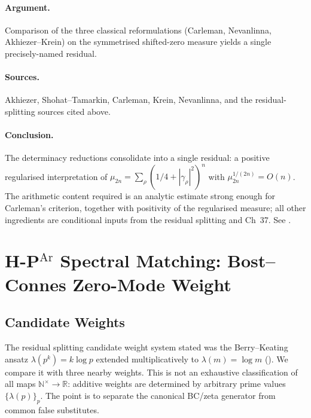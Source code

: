 \paragraph{Argument.} Comparison of the three classical reformulations
(Carleman, Nevanlinna, Akhiezer--Krein) on the symmetrised shifted-zero
measure yields a single precisely-named residual.

\paragraph{Sources.} Akhiezer, Shohat--Tamarkin, Carleman, Krein,
Nevanlinna, and the residual-splitting sources cited above.

\paragraph{Conclusion.} The determinacy reductions consolidate into a single
residual: a positive regularised interpretation of
\(\mu_{2n}=\sum_{\rho}(1/4+|\gamma_{\rho}|^{2})^{n}\) with
\(\mu_{2n}^{1/(2n)}=O(n)\). The arithmetic content required is
an analytic estimate strong enough for Carleman's criterion, together
with positivity of the regularised measure; all other ingredients
are conditional inputs from the residual splitting and Ch~37. See
.

\section{H-P\(^{\mathrm{Ar}}\) Spectral Matching: Bost--Connes Zero-Mode Weight}
\label{v4-arith:hpar-det:weight-selection}

\subsection{Candidate Weights}
\label{v4-arith:hpar-det:candidate-weights}

The residual splitting candidate weight system stated was the Berry--Keating
ansatz \(\lambda(p^{k})=k\log p\) extended multiplicatively to
\(\lambda(m)=\log m\) (). We
compare it with three nearby weights. This is not an
exhaustive classification of all maps
\(\mathbb{N}^{\times}\to\mathbb{R}\): additive weights are determined
by arbitrary prime values \(\{\lambda(p)\}_{p}\). The point is to
separate the canonical BC/zeta generator from common false
substitutes.

